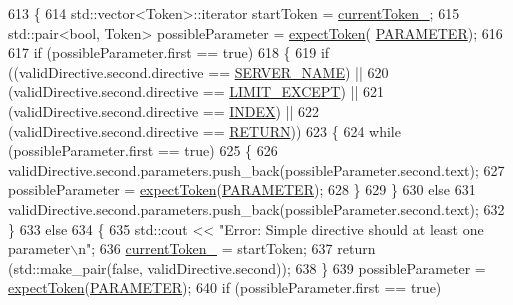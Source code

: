 \begin{DoxyCode}
613     \{
614         std::vector<Token>::iterator startToken = \hyperlink{classft_1_1_parser_a942c5b794d108f144c5b5028aaa34cb6}{currentToken\_};
615         std::pair<bool, Token> possibleParameter = \hyperlink{classft_1_1_parser_a1615a752d3642bb53598e2c8db810db0}{expectToken}(
      \hyperlink{namespaceft_aa520fbf142ba1e7e659590c07da31921a194cde856bd2d79eac8adb9741c55940}{PARAMETER});
616 
617         \textcolor{keywordflow}{if} (possibleParameter.first == \textcolor{keyword}{true})
618         \{
619             \textcolor{keywordflow}{if} ((validDirective.second.directive == \hyperlink{namespaceft_a5a5554dff10f0dc50bae4cc5825ad75da8e7adb687472b53e3ed632cbcb949d88}{SERVER\_NAME}) ||
620                     (validDirective.second.directive == \hyperlink{namespaceft_a5a5554dff10f0dc50bae4cc5825ad75da25b0e84438d71cc28e97f17a01cfde7a}{LIMIT\_EXCEPT}) ||
621                     (validDirective.second.directive == \hyperlink{namespaceft_a5a5554dff10f0dc50bae4cc5825ad75da5f0c05bad71a7b0dd266aae7ce4b3579}{INDEX}) ||
622                     (validDirective.second.directive == \hyperlink{namespaceft_a5a5554dff10f0dc50bae4cc5825ad75da520e09ffec033636dba711f3441cc600}{RETURN}))
623             \{
624                 \textcolor{keywordflow}{while} (possibleParameter.first == \textcolor{keyword}{true})
625                 \{
626                     validDirective.second.parameters.push\_back(possibleParameter.second.text);
627                     possibleParameter = \hyperlink{classft_1_1_parser_a1615a752d3642bb53598e2c8db810db0}{expectToken}(\hyperlink{namespaceft_aa520fbf142ba1e7e659590c07da31921a194cde856bd2d79eac8adb9741c55940}{PARAMETER});
628                 \}
629             \}
630             \textcolor{keywordflow}{else}
631                 validDirective.second.parameters.push\_back(possibleParameter.second.text);
632         \}
633         \textcolor{keywordflow}{else}
634         \{
635             std::cout << \textcolor{stringliteral}{"Error: Simple directive should at least one parameter\(\backslash\)n"};
636             \hyperlink{classft_1_1_parser_a942c5b794d108f144c5b5028aaa34cb6}{currentToken\_} = startToken;
637             \textcolor{keywordflow}{return} (std::make\_pair(\textcolor{keyword}{false}, validDirective.second));
638         \}
639         possibleParameter = \hyperlink{classft_1_1_parser_a1615a752d3642bb53598e2c8db810db0}{expectToken}(\hyperlink{namespaceft_aa520fbf142ba1e7e659590c07da31921a194cde856bd2d79eac8adb9741c55940}{PARAMETER});
640         \textcolor{keywordflow}{if} (possibleParameter.first == \textcolor{keyword}{true})

\end{DoxyCode}

